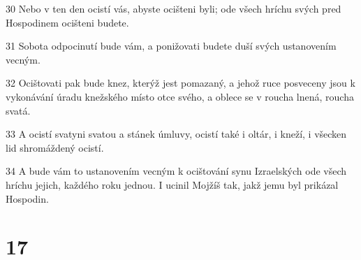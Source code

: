 \par 30 Nebo v ten den ocistí vás, abyste ocišteni byli; ode všech hríchu svých pred Hospodinem ocišteni budete.
\par 31 Sobota odpocinutí bude vám, a ponižovati budete duší svých ustanovením vecným.
\par 32 Ocištovati pak bude knez, kterýž jest pomazaný, a jehož ruce posveceny jsou k vykonávání úradu knežského místo otce svého, a oblece se v roucha lnená, roucha svatá.
\par 33 A ocistí svatyni svatou a stánek úmluvy, ocistí také i oltár, i kneží, i všecken lid shromáždený ocistí.
\par 34 A bude vám to ustanovením vecným k ocištování synu Izraelských ode všech hríchu jejich, každého roku jednou. I ucinil Mojžíš tak, jakž jemu byl prikázal Hospodin.

\chapter{17}

